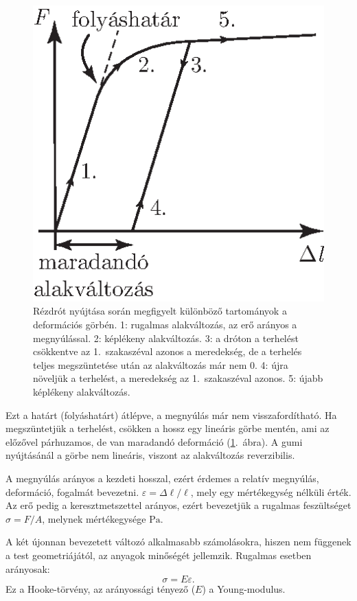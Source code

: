 \documentclass[a4paper, 12pt]{article}
\begin{document}
\begin{figure}[htb]
\centering
\includegraphics[scale=1]{tetel_01_abra_02.eps}
\caption{Rézdrót nyújtása során megfigyelt különböző tartományok a deformációs görbén. 1: rugalmas alakváltozás, az erő arányos a megnyúlással. 2: képlékeny alakváltozás. 3: a dróton a terhelést csökkentve az 1.\ szakaszéval azonos a meredekség, de a terhelés teljes megszüntetése után az alakváltozás már nem 0. 4: újra növeljük a terhelést, a meredekség az 1.\ szakaszéval azonos. 5: újabb képlékeny alakváltozás.\label{fig:ero-elmozd}}
\end{figure}
\FloatBarrier

Ezt a határt (folyáshatárt) átlépve, a megnyúlás már nem visszafordítható. Ha megszüntetjük a terhelést, csökken a hossz egy lineáris görbe mentén, ami az előzővel párhuzamos, de van maradandó deformáció (\ref{fig:ero-elmozd}.\ ábra). A gumi nyújtásánál a görbe nem lineáris, viszont az alakváltozás reverzibilis.


A megnyúlás arányos a kezdeti hosszal, ezért érdemes a relatív megnyúlás, deformáció, fogalmát bevezetni. $\varepsilon={\Delta\ell}/{\ell}$, mely egy mértékegység nélküli érték. Az erő pedig a keresztmetszettel arányos, ezért bevezetjük a rugalmas feszültséget $\sigma={F}/{A}$, melynek mértékegysége $\mathrm{Pa}$. 

A két újonnan bevezetett változó alkalmasabb számolásokra, hiszen nem függenek a test geometriájától, az anyagok minőségét jellemzik. Rugalmas esetben arányosak:
\begin{equation*}
\sigma=E\varepsilon.
\end{equation*}
Ez a Hooke-törvény, az arányossági tényező ($E$) a Young-modulus. 
\end{document}
